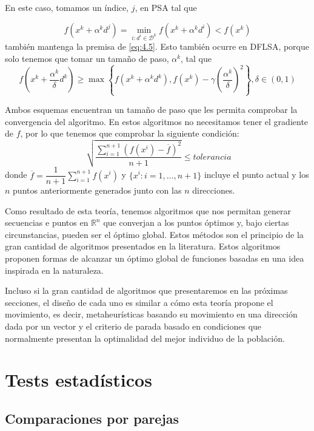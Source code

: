 En este caso, tomamos un índice, $j$, en PSA tal que 

\begin{equation*}
f(x^k+\alpha^kd^j) = \min_{i:d^i\in\mathcal{D}^k} f(x^k+\alpha^kd^i) < f(x^k)
\end{equation*}
también mantenga la premisa de \ref{eq:4.5}. 
Esto también ocurre en DFLSA, porque solo tenemos que tomar un tamaño de paso, $\alpha^k$, tal que
\begin{equation*}
f\left(x^k+\dfrac{\alpha^k}{\delta}d^k\right) \geq \max\left\lbrace f(x^k+\alpha^kd^k), f(x^k)-\gamma\left(\dfrac{\alpha^k}{\delta}\right)^2\right\rbrace, \delta\in(0,1)
\end{equation*}

Ambos esquemas encuentran un tamaño de paso que les permita comprobar la convergencia del algoritmo. 
En estos algoritmos no necesitamos tener el gradiente de $f$, por lo que tenemos que comprobar la siguiente condición:
\begin{equation}
\sqrt[]{\dfrac{\sum_{i=1}^{n+1} (f(x^i)-\overline{f})^2}{n+1}} \leq tolerancia
\label{eq:4.33}
\end{equation}
donde $\overline{f} = \dfrac{1}{n+1}\sum_{i=1}^{n+1}f(x^i)$ y $\{x^i : i=1,\dots,n+1\}$ incluye el punto actual y los $n$ puntos anteriormente generados junto con las $n$ direcciones. 

Como resultado de esta teoría, tenemos algoritmos que nos permitan generar secuencias e puntos en $\mathbb{R}^n$ que converjan a los puntos óptimos y, bajo ciertas circunstancias, pueden ser el óptimo global. 
Estos métodos son el principio de la gran cantidad de algoritmos presentados en la literatura. 
Estos algoritmos proponen formas de alcanzar un óptimo global  de funciones basadas en una idea inspirada en la naturaleza. 

Incluso si la gran cantidad de algoritmos que presentaremos en las próximas secciones, el diseño de cada uno es similar a cómo esta teoría propone el movimiento, es decir, metaheurísticas basando su movimiento en una dirección dada por un vector y el criterio de parada basado en condiciones que normalmente presentan la optimalidad del mejor individuo de la población.

\chapter{Tests estadísticos}
\section{Comparaciones por parejas}

